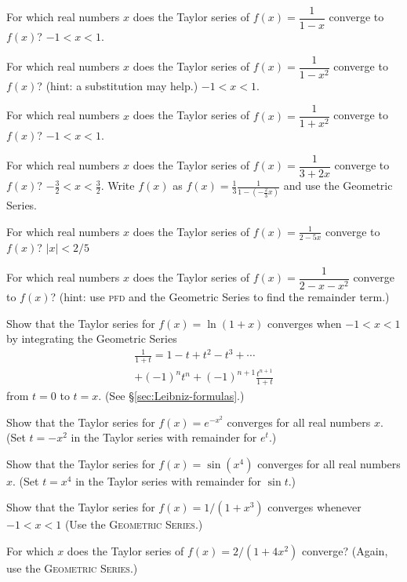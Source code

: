 \begin{multicols}{2}
\problem For which real numbers $x$ does the Taylor series of $f(x) = %
\dfrac1{1-x}$ converge to $f(x)$?
\answer %
$-1 < x <1$.
\endanswer

\problem For which real numbers $x$ does the Taylor series of $f(x) = %
\dfrac1{1-x^2}$ converge to $f(x)$?  (hint: a substitution may help.)
\answer %
$-1<x<1$.
\endanswer

\problem For which real numbers $x$ does the Taylor series of $f(x) = %
\dfrac1{1+x^2}$ converge to $f(x)$?
\answer %
$-1 < x < 1$.
\endanswer

\problem For which real numbers $x$ does the Taylor series of $f(x) = %
\dfrac1{3+2x}$ converge to $f(x)$?
\answer %
$-\frac 32 < x < \frac 32$.  Write $f(x)$ as $f(x) = \frac 13 \frac
1{1-(-\frac23x)}$ and use the Geometric Series.
\endanswer

\problem %
For which real numbers $x$ does the Taylor series of
$f(x)=\frac{1}{2-5x}$ converge to $f(x)$?
\answer $|x|<2/5$  %
\endanswer

\problem \groupproblem  For which real numbers $x$ does the Taylor series of $f(x) = %
\dfrac1{2-x-x^2}$ converge to $f(x)$?  (hint: use \textsc{pfd} and the
Geometric Series to find the remainder term.)

\problem Show that the Taylor series for $f (x)=\ln (1+x)$ converges when %
$-1<x<1$ by integrating the Geometric Series
\begin{multline*}
  \frac{1}{1+t} = 1 - t + t^2 - t^3 + \cdots \\
  + (-1)^nt^n + (-1)^{n+1}\frac{t^{n+1}}{1+t}
\end{multline*}
from $t=0$ to $t=x$. (See \S\ref{sec:Leibniz-formulas}.)

\problem Show that the Taylor series for $f(x)=e^{-x^2}$ converges for %
all real numbers $x$. (Set $t=-x^2$ in the Taylor series with remainder
for $e^t$.)

\problem Show that the Taylor series for $f(x)=\sin(x^4)$ converges for %
all real numbers $x$. (Set $t=x^4$ in the Taylor series with remainder
for $\sin t$.)

\problem Show that the Taylor series for $f(x) = 1/(1+x^3)$ converges %
whenever $-1<x<1$ (Use the \textsc{Geometric Series}.)

\problem For which $x$ does the Taylor series of $f(x)=2/ (1+4x^2)$ %
converge? (Again, use the \textsc{Geometric Series}.)


\end{multicols}
\noproblemfont

